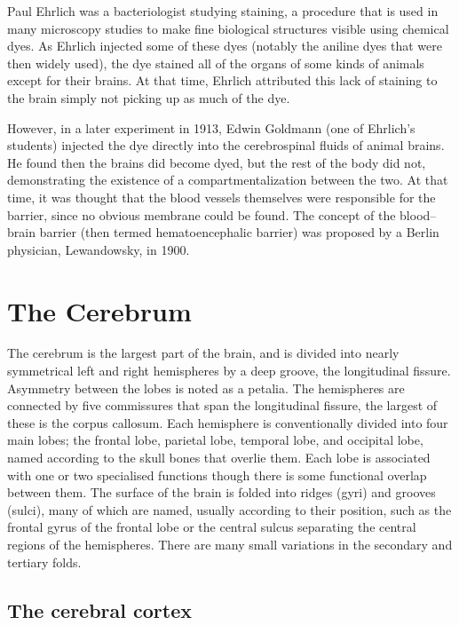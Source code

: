 Paul Ehrlich was a bacteriologist studying staining, a procedure that is used in many microscopy studies to make fine biological structures visible using chemical dyes. As Ehrlich injected some of these dyes (notably the aniline dyes that were then widely used), the dye stained all of the organs of some kinds of animals except for their brains. At that time, Ehrlich attributed this lack of staining to the brain simply not picking up as much of the dye.

However, in a later experiment in 1913, Edwin Goldmann (one of Ehrlich's students) injected the dye directly into the cerebrospinal fluids of animal brains. He found then the brains did become dyed, but the rest of the body did not, demonstrating the existence of a compartmentalization between the two. At that time, it was thought that the blood vessels themselves were responsible for the barrier, since no obvious membrane could be found. The concept of the blood--brain barrier (then termed hematoencephalic barrier) was proposed by a Berlin physician, Lewandowsky, in 1900.

\hypertarget{the-cerebrum}{%
\section{The Cerebrum}\label{the-cerebrum}}

The cerebrum is the largest part of the brain, and is divided into nearly symmetrical left and right hemispheres by a deep groove, the longitudinal fissure. Asymmetry between the lobes is noted as a petalia. The hemispheres are connected by five commissures that span the longitudinal fissure, the largest of these is the corpus callosum. Each hemisphere is conventionally divided into four main lobes; the frontal lobe, parietal lobe, temporal lobe, and occipital lobe, named according to the skull bones that overlie them. Each lobe is associated with one or two specialised functions though there is some functional overlap between them. The surface of the brain is folded into ridges (gyri) and grooves (sulci), many of which are named, usually according to their position, such as the frontal gyrus of the frontal lobe or the central sulcus separating the central regions of the hemispheres. There are many small variations in the secondary and tertiary folds.

\hypertarget{the-cerebral-cortex}{%
\subsection{The cerebral cortex}\label{the-cerebral-cortex}}

